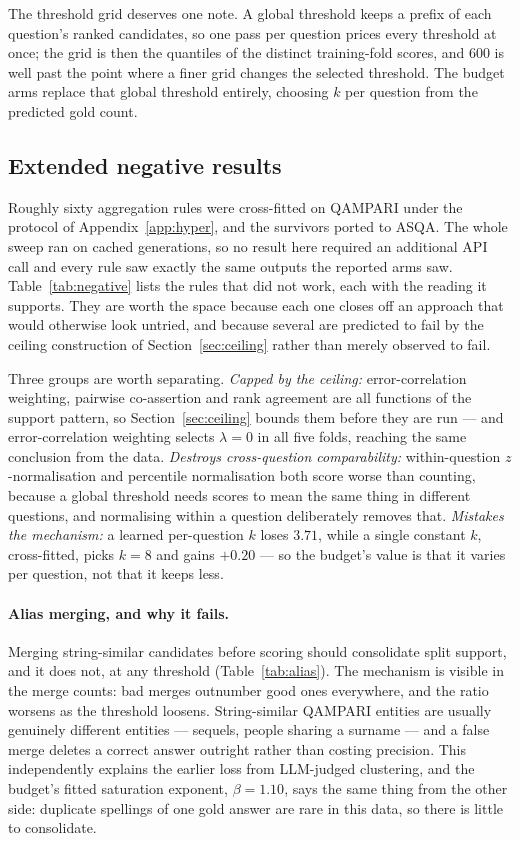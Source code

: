 \documentclass{article}
\begin{document}
The threshold grid deserves one note. A global threshold keeps a prefix of each question's ranked candidates, so one pass per question prices every threshold at once; the grid is then the quantiles of the distinct training-fold scores, and 600 is well past the point where a finer grid changes the selected threshold. The budget arms replace that global threshold entirely, choosing $k$ per question from the predicted gold count.

\subsection{Extended negative results}
\label{app:negative}

Roughly sixty aggregation rules were cross-fitted on QAMPARI under the protocol of Appendix~\ref{app:hyper}, and the survivors ported to ASQA. The whole sweep ran on cached generations, so no result here required an additional API call and every rule saw exactly the same outputs the reported arms saw. Table~\ref{tab:negative} lists the rules that did not work, each with the reading it supports. They are worth the space because each one closes off an approach that would otherwise look untried, and because several are predicted to fail by the ceiling construction of Section~\ref{sec:ceiling} rather than merely observed to fail.

Three groups are worth separating. \emph{Capped by the ceiling:} error-correlation weighting, pairwise co-assertion and rank agreement are all functions of the support pattern, so Section~\ref{sec:ceiling} bounds them before they are run --- and error-correlation weighting selects $\lambda = 0$ in all five folds, reaching the same conclusion from the data. \emph{Destroys cross-question comparability:} within-question $z$-normalisation and percentile normalisation both score worse than counting, because a global threshold needs scores to mean the same thing in different questions, and normalising within a question deliberately removes that. \emph{Mistakes the mechanism:} a learned per-question $k$ loses $3.71$, while a single constant $k$, cross-fitted, picks $k=8$ and gains $+0.20$ --- so the budget's value is that it varies per question, not that it keeps less.

\paragraph{Alias merging, and why it fails.}
Merging string-similar candidates before scoring should consolidate split support, and it does not, at any threshold (Table~\ref{tab:alias}). The mechanism is visible in the merge counts: bad merges outnumber good ones everywhere, and the ratio worsens as the threshold loosens. String-similar QAMPARI entities are usually genuinely different entities --- sequels, people sharing a surname --- and a false merge deletes a correct answer outright rather than costing precision. This independently explains the earlier loss from LLM-judged clustering, and the budget's fitted saturation exponent, $\beta = 1.10$, says the same thing from the other side: duplicate spellings of one gold answer are rare in this data, so there is little to consolidate.
\end{document}
